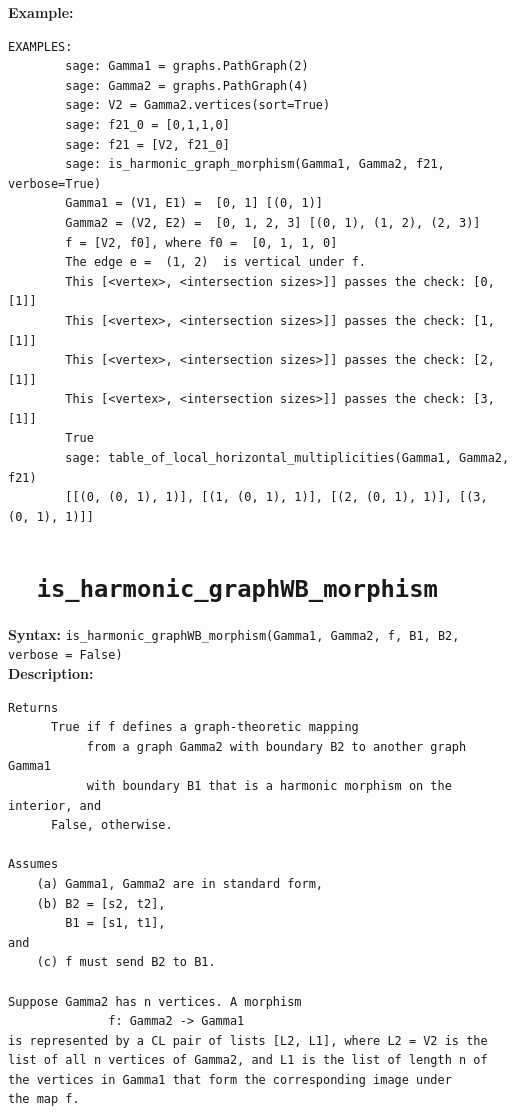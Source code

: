 \documentclass{article}
\begin{document}
\textbf{Example:}
\begin{verbatim}
EXAMPLES:
        sage: Gamma1 = graphs.PathGraph(2)
        sage: Gamma2 = graphs.PathGraph(4)
        sage: V2 = Gamma2.vertices(sort=True)
        sage: f21_0 = [0,1,1,0]
        sage: f21 = [V2, f21_0]
        sage: is_harmonic_graph_morphism(Gamma1, Gamma2, f21, verbose=True)
        Gamma1 = (V1, E1) =  [0, 1] [(0, 1)]
        Gamma2 = (V2, E2) =  [0, 1, 2, 3] [(0, 1), (1, 2), (2, 3)]
        f = [V2, f0], where f0 =  [0, 1, 1, 0]
        The edge e =  (1, 2)  is vertical under f.
        This [<vertex>, <intersection sizes>]] passes the check: [0, [1]]
        This [<vertex>, <intersection sizes>]] passes the check: [1, [1]]
        This [<vertex>, <intersection sizes>]] passes the check: [2, [1]]
        This [<vertex>, <intersection sizes>]] passes the check: [3, [1]]
        True
        sage: table_of_local_horizontal_multiplicities(Gamma1, Gamma2, f21)
        [[(0, (0, 1), 1)], [(1, (0, 1), 1)], [(2, (0, 1), 1)], [(3, (0, 1), 1)]]
\end{verbatim}

\section{\tt \ \ is\_harmonic\_graphWB\_morphism}

\textbf{Syntax:} \verb}is_harmonic_graphWB_morphism(Gamma1, Gamma2, f, B1, B2, verbose = False)}\\

\textbf{Description:}
\begin{verbatim}
Returns 
      True if f defines a graph-theoretic mapping
           from a graph Gamma2 with boundary B2 to another graph Gamma1
           with boundary B1 that is a harmonic morphism on the interior, and 
      False, otherwise. 

Assumes 
    (a) Gamma1, Gamma2 are in standard form,
    (b) B2 = [s2, t2],
        B1 = [s1, t1], 
and 
    (c) f must send B2 to B1.

Suppose Gamma2 has n vertices. A morphism 
              f: Gamma2 -> Gamma1
is represented by a CL pair of lists [L2, L1], where L2 = V2 is the 
list of all n vertices of Gamma2, and L1 is the list of length n of 
the vertices in Gamma1 that form the corresponding image under
the map f.
\end{verbatim}
\end{document}
